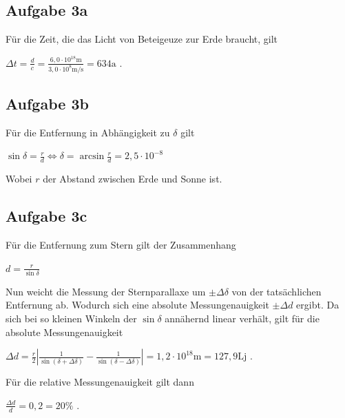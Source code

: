 \documentclass[a4paper,11pt]{article}
\begin{document}
\subsection{Aufgabe 3a}
Für die Zeit, die das Licht von Beteigeuze zur Erde braucht, gilt 
\begin{center}
  $\Delta t = \frac{d}{c} = \frac{6,0 \cdot 10^{18}\mbox{m}}{3,0 \cdot 10^8 \mbox{m/s}} = 634\mbox{a}$ .
\end{center}

\subsection{Aufgabe 3b}
Für die Entfernung in Abhängigkeit zu $\delta$ gilt
\begin{center}
  $
    \sin \delta = \frac{r}{d} \Leftrightarrow 
    \delta     = \arcsin\frac{r}{d} = 2,5 \cdot 10^{-8}
  $
\end{center}
Wobei $r$ der Abstand zwischen Erde und Sonne ist.

\subsection{Aufgabe 3c}
Für die Entfernung zum Stern gilt der Zusammenhang
\begin{center}
  $d = \frac{r}{\sin \delta}$
\end{center}
Nun weicht die Messung der Sternparallaxe um $\pm\Delta\delta$ von der tatsächlichen Entfernung ab. Wodurch sich eine absolute Messungenauigkeit $\pm\Delta d$ ergibt. Da sich bei so kleinen Winkeln der $\sin \delta$ annähernd linear verhält, gilt für die absolute Messungenauigkeit
\begin{center}
  $
    \Delta d = \frac{r}{2} \left|  \frac{1}{\sin(\delta + \Delta\delta)} - \frac{1}{\sin(\delta - \Delta\delta)} \right|
    = 1,2 \cdot 10^{18} \mbox{m} = 127,9 \mbox{Lj}
  $ .
\end{center}
Für die relative Messungenauigkeit gilt dann
\begin{center}
  $
    \frac{\Delta d}{d} = 0,2 = 20 \mbox{\%}
  $ .
\end{center}
\end{document}
